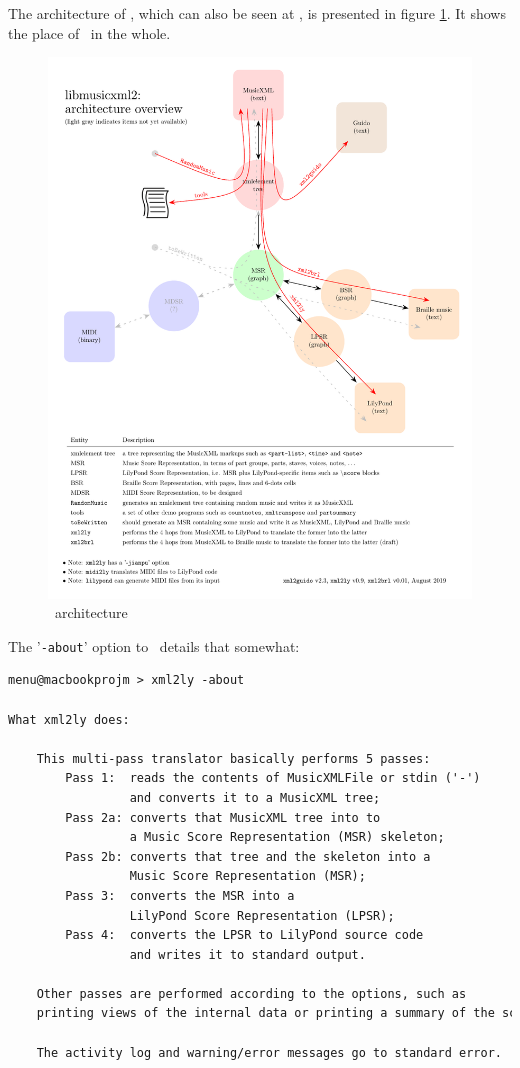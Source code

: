 \documentclass[12pt,a4paper]{article}
\begin{document}
The architecture of \lib, which can also be seen at , is presented in figure \ref{libmusicxmlArchitecture}.
It shows the place of \xmlToLy\ in the whole.

\begin{figure}
\caption{\lib\ architecture}\label{libmusicxmlArchitecture}
\includegraphics[scale=0.8]{../libmusicxmlArchitecture/libmusicxmlArchitecture.pdf}
\end{figure}

The '{\tt -about}' option to \xmlToLy\ details that somewhat:
\begin{lstlisting}[language=XML]
menu@macbookprojm > xml2ly -about

What xml2ly does:

    This multi-pass translator basically performs 5 passes:
        Pass 1:  reads the contents of MusicXMLFile or stdin ('-')
                 and converts it to a MusicXML tree;
        Pass 2a: converts that MusicXML tree into to
                 a Music Score Representation (MSR) skeleton;
        Pass 2b: converts that tree and the skeleton into a
                 Music Score Representation (MSR);
        Pass 3:  converts the MSR into a
                 LilyPond Score Representation (LPSR);
        Pass 4:  converts the LPSR to LilyPond source code
                 and writes it to standard output.

    Other passes are performed according to the options, such as
    printing views of the internal data or printing a summary of the score.

    The activity log and warning/error messages go to standard error.
\end{lstlisting}
\end{document}
